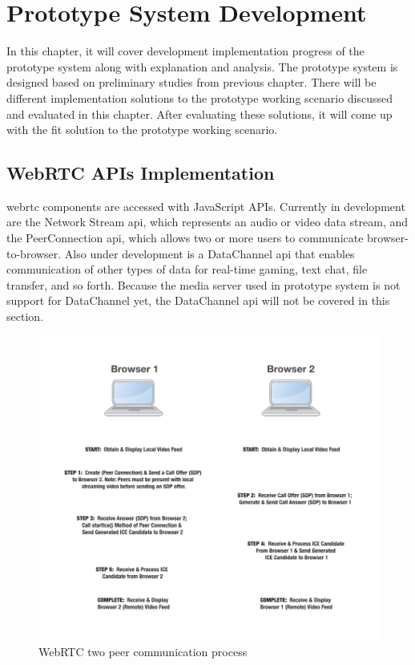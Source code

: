 \chapter{Prototype System Development}
\label{chp:sys_dev}

\noindent In this chapter, it will cover development implementation progress of the prototype system along with explanation and analysis. The prototype system is designed based on preliminary studies from previous chapter. There will be different implementation solutions to the prototype working scenario  discussed and evaluated in this chapter. After evaluating these solutions, it will come up with the fit solution to the prototype working scenario. 

\section{WebRTC APIs Implementation}

\noindent \gls{webrtc} components are accessed with JavaScript APIs. Currently in development are the Network Stream \gls{api}, which represents an audio or video data stream, and the PeerConnection \gls{api}, which allows two or more users to communicate browser-to-browser. Also under development is a DataChannel \gls{api} that enables communication of other types of data for real-time gaming, text chat, file transfer, and so forth. Because the media server used in prototype system is not support for DataChannel yet, the DataChannel \gls{api} will not be covered in this section.

\begin{figure}
	\centering
    	\includegraphics[height=0.50\textheight,natwidth=610,natheight=642]{figs/webrtc_diagram.png}
  	\caption{WebRTC two peer communication process\cite{mdn:p2pwebrtc}}
  	\label{fig:webrtc_diagram}
\end{figure}

